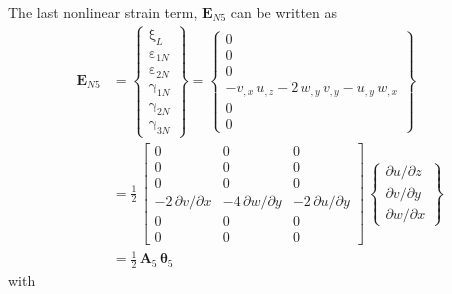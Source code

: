 The last nonlinear strain term, $\mathbf{E}_{N5}$ can be written as
\begin{equation}
	\begin{aligned}
		\mathbf{E}_{N5} & =  \begin{Bmatrix}
			\mathrm \xi_{L} \\
			\mathrm \varepsilon_{1N} \\                    
			\mathrm \varepsilon_{2N} \\           
			\mathrm \gamma_{1N} \\                
			\mathrm \gamma_{2N} \\                
			\mathrm \gamma_{3N} \end{Bmatrix} =   
		\begin{Bmatrix}                       
			0\\
			0   \\
			0  \\
			- v_{,x} \, u_{,z} - 2 \, w_{,y} \, v_{,y}  - u_{,y} \, w_{,x} \\
			0 \\ 
			0 \end{Bmatrix} \\
		& = \frac{1}{2} \, \begin{bmatrix}
			0 & 0 &  0   \\
			0 &  0 & 0  \\
			0 &  0 & 0 \\
			- 2 \, \partial v / \partial x & - 4 \, \partial w / \partial y & - 2 \, \partial u / \partial y  \\
			0 &  0 & 0  \\
			0 &  0 & 0  \end{bmatrix} \, \begin{Bmatrix}
			\partial u / \partial z\\
			\partial v / \partial y \\
			\partial w / \partial x
		\end{Bmatrix} \\
	    &	= \tfrac{1}{2} \, \mathbf{A}_5 \, \boldsymbol{\theta}_5
	\end{aligned}
\end{equation}
with  
